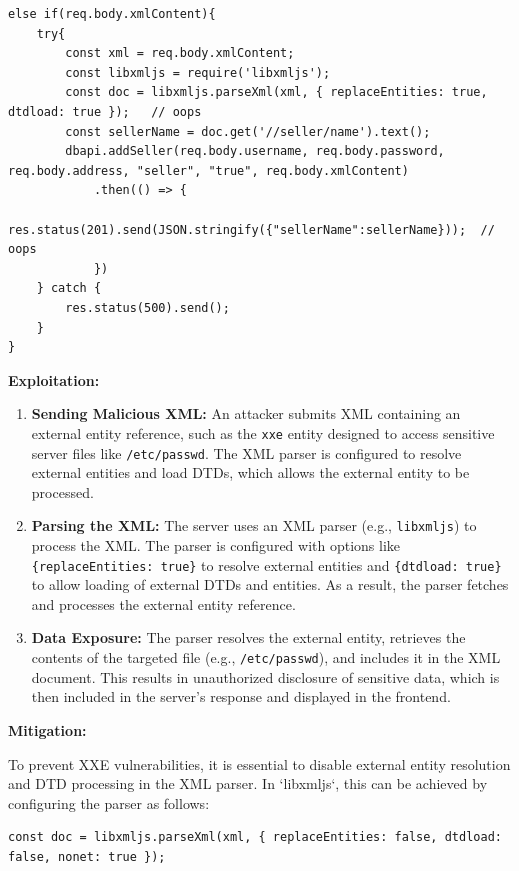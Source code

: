\documentclass[]{article}
\begin{document}
\begin{lstlisting}
else if(req.body.xmlContent){
    try{
        const xml = req.body.xmlContent;
        const libxmljs = require('libxmljs');
        const doc = libxmljs.parseXml(xml, { replaceEntities: true, dtdload: true });   // oops
        const sellerName = doc.get('//seller/name').text();
        dbapi.addSeller(req.body.username, req.body.password, req.body.address, "seller", "true", req.body.xmlContent)
            .then(() => {
                res.status(201).send(JSON.stringify({"sellerName":sellerName}));  // oops
            })
    } catch {
        res.status(500).send();
    }
}
\end{lstlisting}

\textbf{Exploitation:}

\begin{enumerate}
    \item \textbf{Sending Malicious XML:} An attacker submits XML containing an external entity reference, such as the \texttt{xxe} entity designed to access sensitive server files like \texttt{/etc/passwd}. The XML parser is configured to resolve external entities and load DTDs, which allows the external entity to be processed.

    \item \textbf{Parsing the XML:} The server uses an XML parser (e.g., \texttt{libxmljs}) to process the XML. The parser is configured with options like \texttt{\{replaceEntities: true\}} to resolve external entities and \texttt{\{dtdload: true\}} to allow loading of external DTDs and entities. As a result, the parser fetches and processes the external entity reference.

    \item \textbf{Data Exposure:} The parser resolves the external entity, retrieves the contents of the targeted file (e.g., \texttt{/etc/passwd}), and includes it in the XML document. This results in unauthorized disclosure of sensitive data, which is then included in the server's response and displayed in the frontend.
\end{enumerate}

\textbf{Mitigation:}

To prevent XXE vulnerabilities, it is essential to disable external entity resolution and DTD processing in the XML parser. In `libxmljs`, this can be achieved by configuring the parser as follows:

\begin{lstlisting}
const doc = libxmljs.parseXml(xml, { replaceEntities: false, dtdload: false, nonet: true });
\end{lstlisting}
\end{document}
